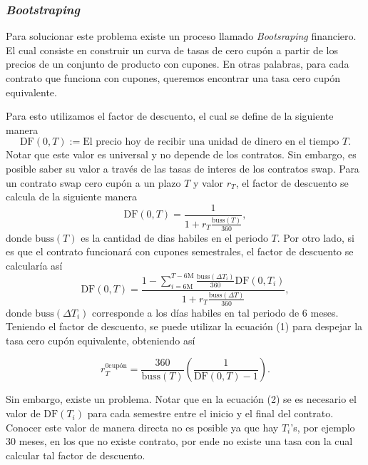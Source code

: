 \subsubsection{\textit{Bootstraping}}

\qquad Para solucionar este problema existe un proceso llamado \textit{Bootsraping} financiero. El cual consiste en construir un curva de tasas de cero cupón a partir de los precios de un conjunto de producto con cupones. En otras palabras, para cada contrato que funciona con cupones, queremos encontrar una tasa cero cupón equivalente.

\qquad Para esto utilizamos el factor de descuento, el cual se define de la siguiente manera
$$ \text{DF}(0,T) := \text{El precio hoy de recibir una unidad de dinero en el tiempo } T.$$
Notar que este valor es universal y no depende de los contratos. Sin embargo, es posible saber su valor a través de las tasas de interes de los contratos swap. Para un contrato swap cero cupón a un plazo $T$ y valor $r_T$, el factor de descuento se calcula de la siguiente manera
\begin{equation}
    \text{DF}(0,T) = \dfrac{1}{1 + r_T \frac{\text{buss}(T)}{360}},
\end{equation}
donde $\text{buss}(T)$ es la cantidad de dias habiles en el periodo $T$. Por otro lado, si es que el contrato funcionará con cupones semestrales, el factor de descuento se calcularía así
\begin{equation}
    \text{DF}(0,T) = \dfrac{1 - \sum_{i= 6\text{M}}^{T - 6\text{M}} \frac{\text{buss}(\Delta T_i)}{360} \text{DF}(0, T_i)}{1 + r_T \frac{\text{buss}(\Delta T)}{360}},
\end{equation}
donde $\text{buss}(\Delta T_i)$ corresponde a los días habiles en tal periodo de 6 meses. Teniendo el factor de descuento, se puede utilizar la ecuación (1) para despejar la tasa cero cupón equivalente, obteniendo así

\begin{equation}
    r_T^{\text{0cupón}} = \dfrac{360}{\text{buss}(T)}\left( \dfrac{1}{\text{DF}(0,T) - 1}\right).
\end{equation}

\qquad Sin embargo, existe un problema. Notar que en la ecuación (2) se es necesario el valor de $\text{DF}(T_i)$ para cada semestre entre el inicio y el final del contrato. Conocer este valor de manera directa no es posible ya que hay $T_i$'s, por ejemplo 30 meses, en los que no existe contrato, por ende no existe una tasa con la cual calcular tal factor de descuento.

